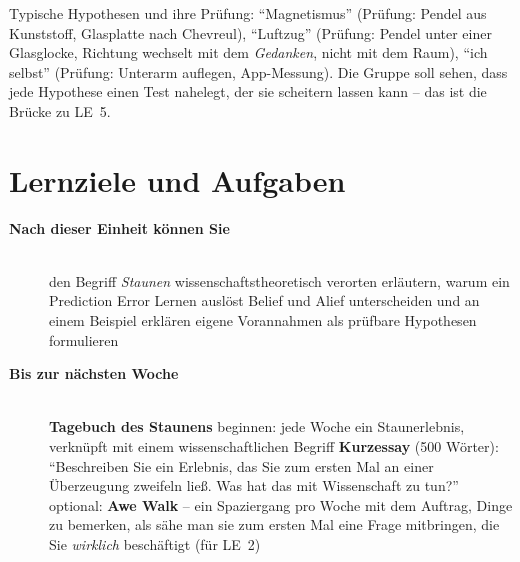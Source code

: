 \begin{lehrhinweis}
Typische Hypothesen und ihre Prüfung: \enquote{Magnetismus} (Prüfung:
Pendel aus Kunststoff, Glasplatte nach Chevreul), \enquote{Luftzug}
(Prüfung: Pendel unter einer Glasglocke, Richtung wechselt mit dem
\emph{Gedanken}, nicht mit dem Raum), \enquote{ich selbst} (Prüfung:
Unterarm auflegen, App-Messung). Die Gruppe soll sehen, dass jede
Hypothese einen Test nahelegt, der sie scheitern lassen kann -- das ist die
Brücke zu LE~5.
\end{lehrhinweis}

\section{Lernziele und Aufgaben}
\begin{description}
\item[{\rot\bf Nach dieser Einheit können Sie}]~\\[-\lblskip]
\bi
  \ite den Begriff \emph{Staunen} wissenschaftstheoretisch verorten
  \ite erläutern, warum ein Prediction Error Lernen auslöst
  \ite Belief und Alief unterscheiden und an einem Beispiel erklären
  \ite eigene Vorannahmen als prüfbare Hypothesen formulieren
\ei
\os{\newpage}

\item[{\rot\bf Bis zur nächsten Woche}]~\\[-\lblskip]
\bi
  \ite \textbf{Tagebuch des Staunens} beginnen: jede Woche ein
    Staunerlebnis, verknüpft mit einem wissenschaftlichen Begriff
  \ite \textbf{Kurzessay} (500 Wörter): \enquote{Beschreiben Sie ein Erlebnis,
    das Sie zum ersten Mal an einer Überzeugung zweifeln ließ. Was hat das
    mit Wissenschaft zu tun?}
  \ite optional: \textbf{Awe Walk} -- ein Spaziergang pro Woche mit dem
    Auftrag, Dinge zu bemerken, als sähe man sie zum ersten Mal
    \parencite{sturm2022awewalk}
  \ite eine Frage mitbringen, die Sie \emph{wirklich} beschäftigt (für LE~2)
\ei
\os{\newpage}
\end{description}

